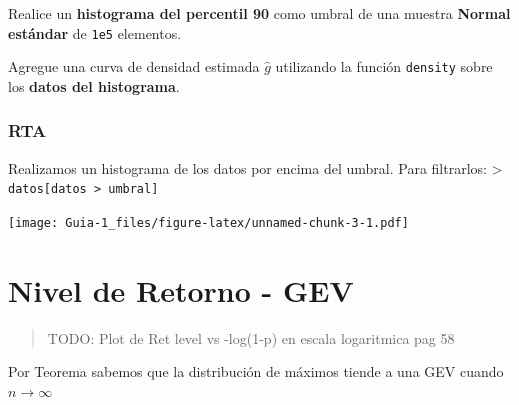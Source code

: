 \documentclass[
]{article}
\newenvironment{Shaded}{\begin{snugshade}}{\end{snugshade}}
\newcommand{\DataTypeTok}[1]{\textcolor[rgb]{0.13,0.29,0.53}{#1}}
\newcommand{\DecValTok}[1]{\textcolor[rgb]{0.00,0.00,0.81}{#1}}
\newcommand{\FloatTok}[1]{\textcolor[rgb]{0.00,0.00,0.81}{#1}}
\newcommand{\KeywordTok}[1]{\textcolor[rgb]{0.13,0.29,0.53}{\textbf{#1}}}
\newcommand{\NormalTok}[1]{#1}
\newcommand{\OperatorTok}[1]{\textcolor[rgb]{0.81,0.36,0.00}{\textbf{#1}}}
\newcommand{\StringTok}[1]{\textcolor[rgb]{0.31,0.60,0.02}{#1}}
\begin{document}
Realice un \textbf{histograma del percentil 90} como umbral de una
muestra \textbf{Normal estándar} de \texttt{1e5} elementos.

Agregue una curva de densidad estimada \(\hat g\) utilizando la función
\texttt{density} sobre los \textbf{datos del histograma}.

\hypertarget{rta-1}{%
\subsubsection{RTA}\label{rta-1}}

Realizamos un histograma de los datos por encima del umbral. Para
filtrarlos: \textgreater{}
\texttt{datos{[}datos\ \textgreater{}\ umbral{]}}

\begin{Shaded}
\end{Shaded}

\texttt{[image: Guia-1\_files/figure-latex/unnamed-chunk-3-1.pdf]}

\hypertarget{nivel-de-retorno---gev}{%
\section{Nivel de Retorno - GEV}\label{nivel-de-retorno---gev}}

\begin{quote}
TODO: Plot de Ret level vs -log(1-p) en escala logaritmica pag 58
\end{quote}

Por Teorema sabemos que la distribución de máximos tiende a una GEV
cuando \(n \rightarrow \infty\)
\end{document}
